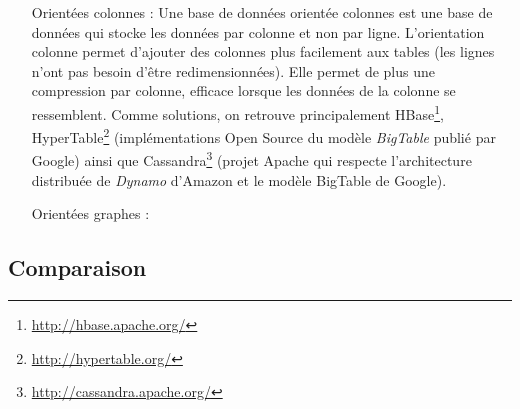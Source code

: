 \begin{itemize}
  \item [Orientées colonnes]: Une base de données orientée colonnes
    est une base de données qui stocke les données par colonne et non
    par ligne. L'orientation colonne permet d'ajouter des colonnes
    plus facilement aux tables (les lignes n'ont pas besoin d'être
    redimensionnées). Elle permet de plus une compression par colonne,
    efficace lorsque les données de la colonne se ressemblent. Comme
    solutions, on retrouve principalement
    HBase\footnote{\url{http://hbase.apache.org/}},
    HyperTable\footnote{\url{http://hypertable.org/}} (implémentations
    Open Source du modèle \emph{BigTable} \cite{chang2008bigtable}
    publié par Google) ainsi que
    Cassandra\footnote{\url{http://cassandra.apache.org/}} (projet
    Apache qui respecte l'architecture distribuée de \emph{Dynamo}
    \cite{decandia2007dynamo} d'Amazon et le modèle BigTable de
    Google).

  \item [Orientées graphes]: %
  \end{itemize}

  \subsection{Comparaison}
  \label{nosql-comp}

\newpage
